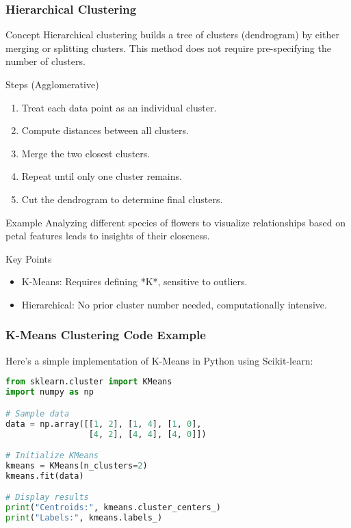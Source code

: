 \documentclass[aspectratio=169]{beamer}
\begin{document}
\begin{frame}[fragile]
    \frametitle{Hierarchical Clustering}
    \begin{block}{Concept}
        Hierarchical clustering builds a tree of clusters (dendrogram) by either merging or splitting clusters. This method does not require pre-specifying the number of clusters.
    \end{block}
    
    \begin{block}{Steps (Agglomerative)}
        \begin{enumerate}
            \item Treat each data point as an individual cluster.
            \item Compute distances between all clusters.
            \item Merge the two closest clusters.
            \item Repeat until only one cluster remains.
            \item Cut the dendrogram to determine final clusters.
        \end{enumerate}
    \end{block}

    \begin{block}{Example}
        Analyzing different species of flowers to visualize relationships based on petal features leads to insights of their closeness.
    \end{block}
    
    \begin{block}{Key Points}
        \begin{itemize}
            \item K-Means: Requires defining *K*, sensitive to outliers.
            \item Hierarchical: No prior cluster number needed, computationally intensive.
        \end{itemize}
    \end{block}
\end{frame}

\begin{frame}[fragile]
    \frametitle{K-Means Clustering Code Example}
    Here’s a simple implementation of K-Means in Python using Scikit-learn:

    \begin{lstlisting}[language=Python]
from sklearn.cluster import KMeans
import numpy as np

# Sample data
data = np.array([[1, 2], [1, 4], [1, 0],
                 [4, 2], [4, 4], [4, 0]])

# Initialize KMeans
kmeans = KMeans(n_clusters=2)
kmeans.fit(data)

# Display results
print("Centroids:", kmeans.cluster_centers_)
print("Labels:", kmeans.labels_)
    \end{lstlisting}
\end{frame}
\end{document}
